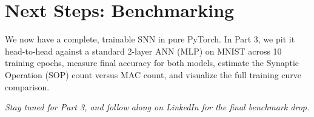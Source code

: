 \documentclass[12pt]{article}
\begin{document}
\section*{Next Steps: Benchmarking}
We now have a complete, trainable SNN in pure PyTorch. In Part 3, we pit it head-to-head against a standard 2-layer ANN (MLP) on MNIST across 10 training epochs, measure final accuracy for both models, estimate the Synaptic Operation (SOP) count versus MAC count, and visualize the full training curve comparison.

\vspace{1em}
\noindent \textit{Stay tuned for Part 3, and follow along on LinkedIn for the final benchmark drop.}
\end{document}
